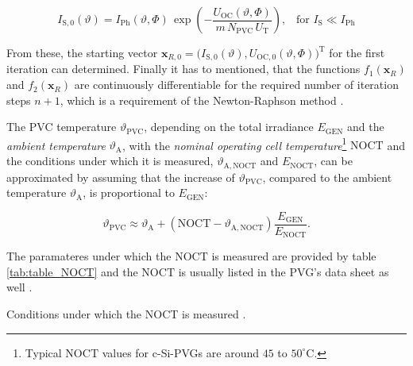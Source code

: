 \begin{center}
	\begin{equation} \label{I_S_theta_phi_zero}
		I_\mathrm{S,0}\left(\vartheta\right) = I_{\mathrm{Ph}}\left( \vartheta, \Phi \right) \, \exp \left( - \frac{U_\mathrm{OC}\left(\vartheta,\Phi\right)}{m \, N_\mathrm{PVC} \, U_\mathrm{T}} \right) \text{,} \quad \text{for } I_\mathrm{S} \ll I_\mathrm{Ph}
	\end{equation}
\end{center}
From these, the starting vector $\mathrm{\mathbf{x}}_{R,0} = \big( I_\mathrm{S,0}\left(\vartheta\right), U_\mathrm{OC,0}\left(\vartheta,\Phi\right) \big)^{\mathrm T}$ for the first iteration can determined. Finally it has to mentioned, that the functions $f_1\left( \mathrm{\mathbf{x}}_R \right)$ and $f_2\left( \mathrm{\mathbf{x}}_R \right)$ are continuously differentiable for the required number of iteration steps $n + 1$, which is a requirement of the Newton-Raphson method \cite{Schwarz:2011, Rudolf:2014, Taschner:2014, Mertens:2015, Wagner:2018, Kugi:2021}.

The PVC temperature $\vartheta_{\mathrm{PVC}}$, depending on the total irradiance $E_{\mathrm{GEN}}$ and the \emph{ambient temperature} $\vartheta_{\mathrm{A}}$, with the \emph{nominal operating cell temperature}\footnote{Typical $\mathrm{NOCT}$ values for c-Si-PVGs are around $45$ to $50^\circ \mathrm{C}$.} $\mathrm{NOCT}$ and the conditions under which it is measured, $\vartheta_{\mathrm{A,NOCT}}$ and $E_{\mathrm{NOCT}}$, can be approximated by assuming that the increase of $\vartheta_{\mathrm{PVC}}$, compared to the ambient temperature $\vartheta_{\mathrm{A}}$, is proportional to $E_{\mathrm{GEN}}$:
\begin{center}
	\begin{equation} \label{eq:cell_temp}
		\vartheta_{\mathrm{PVC}} \approx \vartheta_{\mathrm{A}} + \left(\mathrm{NOCT} - \vartheta_{\mathrm{A,NOCT}}\right) \frac{E_{\mathrm{GEN}}}{E_{\mathrm{NOCT}}} \text{.}
	\end{equation}
\end{center}
The paramateres under which the $\mathrm{NOCT}$ is measured are provided by table \ref{tab:table_NOCT} and the $\mathrm{NOCT}$ is usually listed in the PVG's data sheet as well \cite{Mertens:2015}.

\begin{table}[h!]
	\centering
	
	\caption{Conditions under which the NOCT is measured \cite{Mertens:2015}.}
	\label{tab:table_NOCT}
\end{table}

